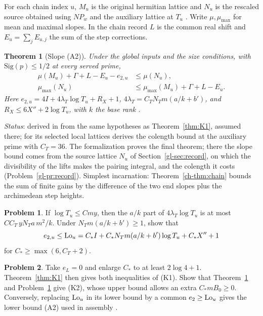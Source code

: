 \documentclass[reqno]{amsart}
\theoremstyle{definition}
\newtheorem{problem}{Problem}[section]
\theoremstyle{plain}
\newtheorem{theorem}{Theorem}[section]
\newcommand{\Sig}{\mathrm{Sig}}
\begin{document}
For each chain index \(u\), \(M_u\) is the original hermitian lattice and \(N_u\) is the rescaled source obtained using \(N\!P_w\) and the auxiliary lattice at \(T_u\) \cite[Def.~12.20]{Adr}. Write \(\mu,\mu_{\max}\) for mean and maximal slopes. In the chain record \(L\) is the common real shift and \(E_u=\sum_jE_{u,j}\) the sum of the step corrections.
\begin{theorem}[Slope (A2)]\label{thm:K2}
Under the global inputs and the size conditions, with \(\Sig(p)\le1/2\) at every served prime,
\begin{align*}
 \mu(M_u)+\Gamma+L-E_u-e_{2,u}&\le\mu(N_u),\\
 \mu_{\max}(N_u)&\le\mu_{\max}(M_u)+\Gamma+L-E_u .
\end{align*}
Here \(e_{2,u}=4I+4\lambda_T\log T_u+R_X+1\),
\(4\lambda_T=C_T N_Tm(a/k+b')\), and \(R_X\le6X''+2\log T_u\), with \(k\) the base rank \cite[Thm.~12.21]{Adr}.
\end{theorem}
\noindent \emph{Status}: derived in \cite[Thm.~12.21]{Adr} from the same hypotheses as Theorem~\ref{thm:K1}, assumed there; for its selected local lattices \cite[\S18.7]{Adr} derives the colength bound at the auxiliary prime \cite[\S12.6, (L7)]{Adr} with \(C_T = 36\).  The formalization proves the final theorem; there the slope bound comes from the source lattice \(N_u\) of Section~\ref{gl-sec:record}, on which the divisibility of the lifts makes the pairing integral, and the colength it costs (Problem~\ref{gl-pr:record}).  Simplest incarnation: Theorem~\ref{ch-thm:chain} bounds the sum of finite gains by the difference of the two end slopes plus the archimedean step heights.

\begin{problem}\label{pr:aux}
If \(\log T_u\le Cmy\), then the \(a/k\) part of \(4\lambda_T\log T_u\) is at most \(CC_T\,yN_Ta\,m^2/k\). Under \(N_Tm(a/k+b')\ge1\), show that
\[
 e_{2,u}\le {\rm Lo}_u
 =C_* I+C_*N_Tm(a/k+b')\log T_u+C_*X''+1
\]
for \(C_*\ge\max(6,C_T+2)\).
\end{problem}
\begin{problem}\label{pr:record}
Take \(e_L=0\) and enlarge \(C_*\) to at least \(2\log4+1\). Theorem~\ref{thm:K1} then gives both inequalities of (K1). Show that Theorem~\ref{thm:K2} and Problem~\ref{pr:aux} give (K2), whose upper bound allows an extra \(C_*mB_0\ge0\). Conversely, replacing \({\rm Lo}_u\) in its lower bound by a common \(e_2\ge{\rm Lo}_u\) gives the lower bound (A2) used in assembly \cite[Lem.~18.13, Prop.~18.14]{Adr}.
\end{problem}
\end{document}
